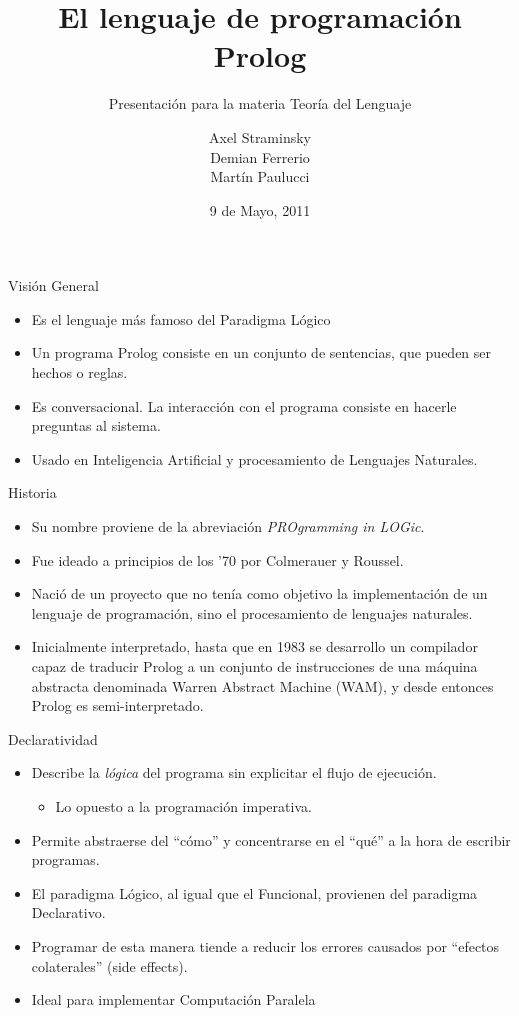 \documentclass[xcolor=dvipsnames]{beamer}
\title{El lenguaje de programación Prolog}
\subtitle{Presentación para la materia Teoría del Lenguaje}
\author{
Axel Straminsky \\
Demian Ferrerio \\
Martín Paulucci
}
\institute[UMBC]{
  Facultad de Ingeniería\\
  Universidad de Buenos Aires \\
}
\date{9 de Mayo, 2011}
\begin{document}
\begin{frame}[plain]
  \titlepage
\end{frame}

\begin{frame}{Visión General}

\begin{itemize}
\item Es el lenguaje más famoso del Paradigma Lógico
\item Un programa Prolog consiste en un conjunto de sentencias, que pueden ser hechos o reglas.
\item Es conversacional. La interacción con el programa consiste en hacerle preguntas al sistema.
\item Usado en Inteligencia Artificial y procesamiento de Lenguajes Naturales.
\end{itemize}

\end{frame}

\begin{frame}{Historia}

\begin{itemize}
\item Su nombre proviene de la abreviación \textit{PROgramming in LOGic}.
\item Fue ideado a principios de los '70 por Colmerauer y Roussel.
\item Nació de un proyecto que no tenía como objetivo la implementación de un lenguaje de programación, sino el procesamiento de lenguajes naturales.
\item Inicialmente interpretado,  hasta que en 1983 se desarrollo un compilador capaz de traducir Prolog a un conjunto de instrucciones de una máquina abstracta denominada Warren Abstract Machine (WAM), y desde entonces Prolog es semi-interpretado.
\end{itemize}

\end{frame}

\begin{frame}{Declaratividad}
 
\begin{itemize}
 \item Describe la \emph{lógica} del programa sin explicitar el flujo de ejecución.
 \begin{itemize}
  \item Lo opuesto a la programación imperativa.
 \end{itemize}
 \item Permite abstraerse del “cómo” y concentrarse en el “qué” a la hora de escribir programas.
 \item El paradigma Lógico, al igual que el Funcional, provienen del paradigma Declarativo.
 \item Programar de esta manera tiende a reducir los errores causados por ``efectos colaterales'' (side effects).
 \item Ideal para implementar Computación Paralela
\end{itemize}

\end{frame}
\end{document}
